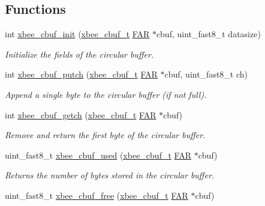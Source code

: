 \subsection*{Functions}
\begin{DoxyCompactItemize}
\item 
int \hyperlink{group__util__cbuf_gabf58cafa9f3e989b433a14c23a94cebb}{xbee\-\_\-cbuf\-\_\-init} (\hyperlink{structxbee__cbuf__t}{xbee\-\_\-cbuf\-\_\-t} \hyperlink{group__hal_gaef060b3456fdcc093a7210a762d5f2ed}{F\-A\-R} $\ast$cbuf, uint\-\_\-fast8\-\_\-t datasize)
\begin{DoxyCompactList}\small\item\em Initialize the fields of the circular buffer. \end{DoxyCompactList}\item 
int \hyperlink{group__util__cbuf_gaab9462b172fea45fc3e5ce2b3a5cca10}{xbee\-\_\-cbuf\-\_\-putch} (\hyperlink{structxbee__cbuf__t}{xbee\-\_\-cbuf\-\_\-t} \hyperlink{group__hal_gaef060b3456fdcc093a7210a762d5f2ed}{F\-A\-R} $\ast$cbuf, uint\-\_\-fast8\-\_\-t ch)
\begin{DoxyCompactList}\small\item\em Append a single byte to the circular buffer (if not full). \end{DoxyCompactList}\item 
int \hyperlink{group__util__cbuf_gaf78d1608008ebde71b57a6bf34e6a3e1}{xbee\-\_\-cbuf\-\_\-getch} (\hyperlink{structxbee__cbuf__t}{xbee\-\_\-cbuf\-\_\-t} \hyperlink{group__hal_gaef060b3456fdcc093a7210a762d5f2ed}{F\-A\-R} $\ast$cbuf)
\begin{DoxyCompactList}\small\item\em Remove and return the first byte of the circular buffer. \end{DoxyCompactList}\item 
uint\-\_\-fast8\-\_\-t \hyperlink{group__util__cbuf_gaf3ac1a430fe9dbe3498e96c3b96bb0f7}{xbee\-\_\-cbuf\-\_\-used} (\hyperlink{structxbee__cbuf__t}{xbee\-\_\-cbuf\-\_\-t} \hyperlink{group__hal_gaef060b3456fdcc093a7210a762d5f2ed}{F\-A\-R} $\ast$cbuf)
\begin{DoxyCompactList}\small\item\em Returns the number of bytes stored in the circular buffer. \end{DoxyCompactList}\item 
uint\-\_\-fast8\-\_\-t \hyperlink{group__util__cbuf_ga9a2eeedf642bdf31dba98aacdc5a7d75}{xbee\-\_\-cbuf\-\_\-free} (\hyperlink{structxbee__cbuf__t}{xbee\-\_\-cbuf\-\_\-t} \hyperlink{group__hal_gaef060b3456fdcc093a7210a762d5f2ed}{F\-A\-R} $\ast$cbuf)

\end{DoxyCompactItemize}
